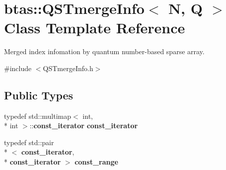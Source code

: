 \section{btas\-:\-:Q\-S\-Tmerge\-Info$<$ N, Q $>$ Class Template Reference}
\label{d0/de7/classbtas_1_1QSTmergeInfo}


Merged index infomation by quantum number-\/based sparse array.  




{\ttfamily \#include $<$Q\-S\-Tmerge\-Info.\-h$>$}

\subsection*{Public Types}
\begin{DoxyCompactItemize}
\item 
typedef std\-::multimap$<$ int, \\*
int $>$\-::{\bf const\-\_\-iterator} {\bf const\-\_\-iterator}
\item 
typedef std\-::pair\\*
$<$ {\bf const\-\_\-iterator}, \\*
{\bf const\-\_\-iterator} $>$ {\bf const\-\_\-range}
\end{DoxyCompactItemize}
